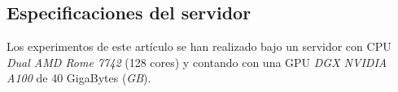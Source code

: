         \subsection{Especificaciones del servidor}
            Los experimentos de este artículo se han realizado bajo un servidor con CPU \textit{Dual AMD Rome 7742} (128 cores) y contando con una GPU \textit{DGX NVIDIA A100} de  40 GigaBytes (\textit{GB}).
            